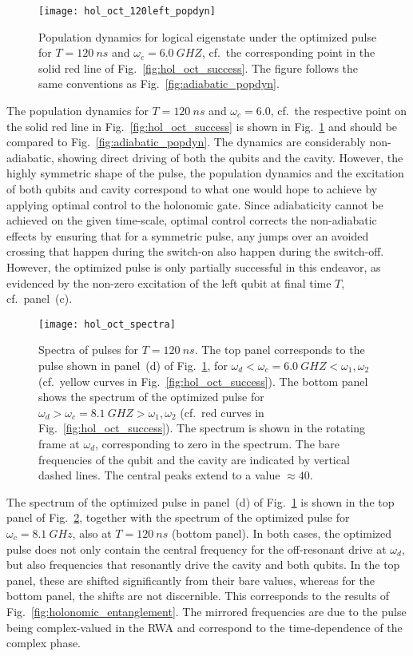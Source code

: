 \begin{figure}[p]
  \centering
  \texttt{[image: hol\_oct\_120left\_popdyn]}
  \caption{Population dynamics for logical eigenstate  under the
  optimized pulse for $T=\SI{120}{ns}$ and $\omega_c = \SI{6.0}{GHZ}$, cf.\ the
  corresponding point in the solid red line of Fig.~\ref{fig:hol_oct_success}.
  The figure follows the same conventions as Fig.~\ref{fig:adiabatic_popdyn}.
  }
  \label{fig:hol_oct_120left_popdyn}
\end{figure}
The population dynamics for $T=\SI{120}{ns}$ and $\omega_c = 6.0$, cf.~the
respective point on the solid red line in Fig.~\ref{fig:hol_oct_success} is
shown in Fig.~\ref{fig:hol_oct_120left_popdyn} and should be compared to
Fig.~\ref{fig:adiabatic_popdyn}. The dynamics are considerably non-adiabatic,
showing direct driving of both the qubits and the cavity. However, the highly
symmetric shape of the pulse, the population dynamics and the excitation of both
qubits and cavity correspond to what one would hope to achieve by applying
optimal control to the holonomic gate. Since adiabaticity cannot be achieved on
the given time-scale, optimal control corrects the non-adiabatic effects by
ensuring that for a symmetric pulse, any jumps over an avoided crossing that
happen during the switch-on also happen during the switch-off. However, the
optimized pulse is only partially successful in this endeavor, as evidenced by
the non-zero excitation of the left qubit at final time $T$, cf.\ panel~(c).

\begin{figure}[p]
  \centering
  \texttt{[image: hol\_oct\_spectra]}
  \caption{Spectra of  pulses for $T=\SI{120}{ns}$.
  The top panel corresponds to the pulse shown in
  panel~(d) of Fig.~\ref{fig:hol_oct_120left_popdyn}, for
  $\omega_d < \omega_c = \SI{6.0}{GHZ} < \omega_1, \omega_2$
  (cf.\ yellow curves in Fig.~\ref{fig:hol_oct_success}).
  The bottom panel  shows the spectrum of the optimized pulse for
  $\omega_d > \omega_c = \SI{8.1}{GHZ} > \omega_1, \omega_2$
  (cf.\ red curves in Fig.~\ref{fig:hol_oct_success}). The spectrum is shown in
  the rotating frame at $\omega_d$, corresponding to zero in the spectrum.
  The bare frequencies of the qubit and the cavity are indicated by vertical
  dashed lines. The central peaks extend to a value $\approx 40$.
  }
  \label{fig:hol_oct_spectra}
\end{figure}
The spectrum of the optimized pulse in panel~(d) of
Fig.~\ref{fig:hol_oct_120left_popdyn} is shown in the top panel of
Fig.~\ref{fig:hol_oct_spectra}, together with the spectrum of the optimized
pulse for $\omega_c = \SI{8.1}{GHz}$, also at $T=\SI{120}{ns}$ (bottom panel).
In both cases, the optimized pulse does not only contain the central frequency
for the off-resonant drive at $\omega_d$, but also frequencies that resonantly
drive the cavity and both qubits. In the top panel, these are shifted
significantly from their bare values, whereas for the bottom panel, the shifts
are not discernible. This corresponds to the results of
Fig.~\ref{fig:holonomic_entanglement}. The mirrored frequencies are due to the
pulse being complex-valued in the RWA and correspond to the time-dependence of
the complex phase.

